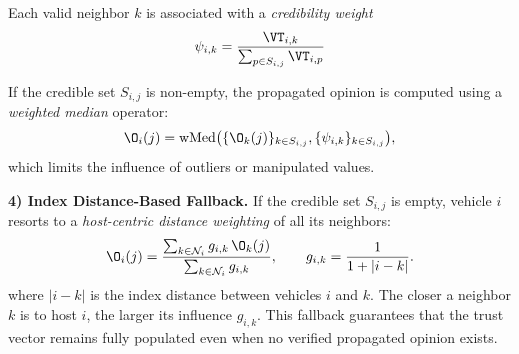 Each valid neighbor $k$ is associated with a \emph{credibility weight} 
\begin{equation}
\psi_{i,k} = \frac{\VT_{i,k}}{\sum_{p \in S_{i,j}} \VT_{i,p}}
\label{eq:weight}
\end{equation}

If the credible set $S_{i,j}$ is non-empty, the propagated opinion is computed 
using a \emph{weighted median} operator:
\begin{equation}
\O_i(j) = \operatorname{wMed}
\bigl(
\{ \O_k(j) \}_{k\in S_{i,j}},
\{ \psi_{i,k} \}_{k\in S_{i,j}}
\bigr),
\label{eq:weighted_median}
\end{equation}
which limits the influence of outliers or manipulated values.

\vspace{1ex}
\noindent\textbf{4) Index Distance-Based Fallback.}
If the credible set $S_{i,j}$ is empty, 
vehicle $i$ resorts to a \emph{host-centric distance weighting} of all its neighbors:
\begin{equation}
\O_i(j) =
\frac{\sum_{k\in\mathcal{N}_i} g_{i,k} \, \O_k(j)}{\sum_{k\in\mathcal{N}_i} g_{i,k}},
\qquad
g_{i,k} = 
\frac{1}
{1 + |i - k|} .
\label{eq:distance}
\end{equation}
where $|i - k|$ is the index distance between vehicles $i$ and $k$.
The closer a neighbor $k$ is to host $i$, the larger its influence $g_{i,k}$.
This fallback guarantees that the trust vector remains fully populated even when 
no verified propagated opinion exists.


